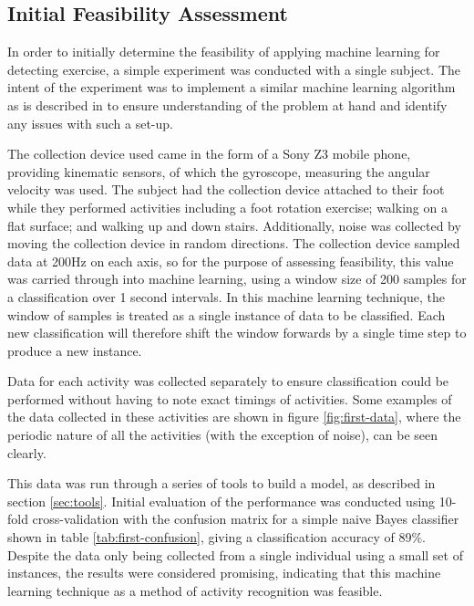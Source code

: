 \subsection{Initial Feasibility Assessment}
In order to initially determine the feasibility of applying machine learning for detecting exercise, a simple experiment was conducted with a single subject. The intent of the experiment was to implement a similar machine learning algorithm as is described in \cite{kwapisz2011activity} to ensure understanding of the problem at hand and identify any issues with such a set-up.

The collection device used came in the form of a Sony Z3 mobile phone, providing kinematic sensors, of which the gyroscope, measuring the angular velocity was used. The subject had the collection device attached to their foot while they performed activities including a foot rotation exercise; walking on a flat surface; and walking up and down stairs. Additionally, noise was collected by moving the collection device in random directions. The collection device sampled data at 200Hz on each axis, so for the purpose of assessing feasibility, this value was carried through into machine learning, using a window size of 200 samples for a classification over 1 second intervals. In this machine learning technique, the window of samples is treated as a single instance of data to be classified. Each new classification will therefore shift the window forwards by a single time step to produce a new instance.

Data for each activity was collected separately to ensure classification could be performed without having to note exact timings of activities. Some examples of the data collected in these activities are shown in figure \ref{fig:first-data}, where the periodic nature of all the activities (with the exception of noise), can be seen clearly.

This data was run through a series of tools to build a model, as described in section \ref{sec:tools}. Initial evaluation of the performance was conducted using 10-fold cross-validation with the confusion matrix for a simple naive Bayes classifier shown in table \ref{tab:first-confusion}, giving a classification accuracy of 89\%. Despite the data only being collected from a single individual using a small set of instances, the results were considered promising, indicating that this machine learning technique as a method of activity recognition was feasible.


